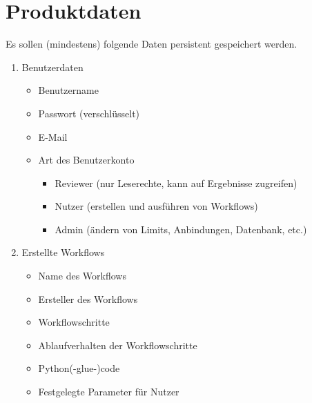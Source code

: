 \chapter{Produktdaten}
Es sollen (mindestens) folgende Daten persistent gespeichert werden.

\renewcommand{\labelenumi}{/PD\arabic{enumi}0/}
 \begin{enumerate}
    \item Benutzerdaten
    \begin{itemize}
        \setlength\itemsep{-1em}
        \item Benutzername
        \item Passwort (verschlüsselt)
        \item E-Mail
        \item Art des Benutzerkonto
        \begin{itemize}
            \setlength\itemsep{-1em}
            \item \gls{Reviewer} (nur Leserechte, kann auf Ergebnisse zugreifen)
            \item \gls{Nutzer} (erstellen und ausführen von Workflows)
            \item \gls{Admin} (ändern von Limits, Anbindungen, Datenbank, etc.)
        \end{itemize}
    \end{itemize}
    
    \item Erstellte Workflows
    \begin{itemize}
        \setlength\itemsep{-1em}
        \item Name des \glspl{Workflow}
        \item Ersteller des Workflows
        \item Workflowschritte
        \item Ablaufverhalten der Workflowschritte
        \item Python(-glue-)code
        \item Festgelegte Parameter für Nutzer
    \end{itemize}
    

\end{enumerate}
